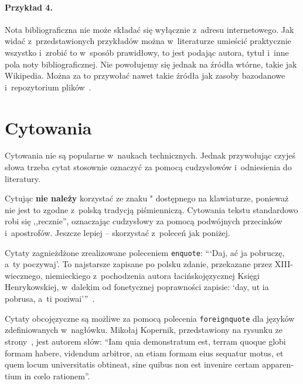\paragraph{Przykład 4.} Nota bibliograficzna nie może składać się wyłącznie z~adresu internetowego. Jak widać z~przedstawionych przykładów można w~literaturze umieścić praktycznie wszystko i~zrobić to w~sposób prawidłowy, to jest podając autora, tytuł i~inne pola noty bibliograficznej. Nie powołujemy się jednak na źródła wtórne, takie jak Wikipedia. Można za to przywołać nawet takie źródła jak zasoby bazodanowe i~repozytorium plików~\cite{szablon}.

\section{Cytowania}
Cytowania nie są popularne w~naukach technicznych. Jednak przywołując czyjeś słowa trzeba cytat stosownie oznaczyć za pomocą cudzysłowów i~odniesienia do literatury.

Cytując \textbf{nie należy} korzystać ze znaku " dostępnego na klawiaturze, ponieważ nie jest to zgodne z~polską tradycją piśmienniczą. Cytowania tekstu standardowo robi się ,,recznie'', oznaczając cudzysłowy za pomocą podwójnych przecinków i~apostrofów. Jeszcze lepiej -- skorzystać z~poleceń jak poniżej.

Cytaty zagnieżdżone zrealizowane poleceniem \texttt{enquote}:
\enquote{\enquote{Daj, ać ja pobruczę, a~ty poczywaj}. To najstarsze zapisane po polsku zdanie, przekazane przez XIII-wiecznego, niemieckiego z~pochodzenia autora łacińskojęzycznej Księgi Henrykowskiej, w~dalekim od fonetycznej poprawności zapisie: \enquote{day, ut ia pobrusa, a~ti poziwai}}~\cite{wilamowski2017}.

Cytaty obcojęzyczne są możliwe za pomocą polecenia \texttt{foreignquote} dla języków zdefiniowanych w~nagłówku. Mikołaj Kopernik, przedstawiony na rysunku ze strony~\pageref{rys:kopernik}, jest autorem słów: \foreignquote{latin}{Iam quia demonstratum est, terram quoque globi formam habere, videndum arbitror, an etiam formam eius sequatur motus, et quem locum universitatis obtineat, sine quibus non est invenire certam apparentium in cœlo rationem}.

